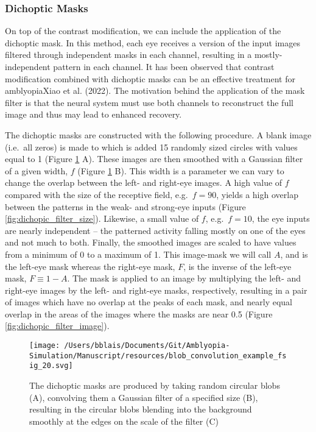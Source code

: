 \documentclass[
  onecolumn]{article}
\begin{document}
\hypertarget{dichoptic-masks}{%
\subsubsection{Dichoptic Masks}\label{dichoptic-masks}}

On top of the contrast modification, we can include the application of
the dichoptic mask. In this method, each eye receives a version of the
input images filtered through independent masks in each channel,
resulting in a mostly-independent pattern in each channel. It has been
observed that contrast modification combined with dichoptic masks can be
an effective treatment for amblyopiaXiao et al. (2022). The motivation
behind the application of the mask filter is that the neural system must
use both channels to reconstruct the full image and thus may lead to
enhanced recovery.

The dichoptic masks are constructed with the following procedure. A
blank image (i.e.~all zeros) is made to which is added 15 randomly sized
circles with values equal to 1 (Figure \ref{fig:dichopic_blob} A). These
images are then smoothed with a Gaussian filter of a given width, \(f\)
(Figure \ref{fig:dichopic_blob} B). This width is a parameter we can
vary to change the overlap between the left- and right-eye images. A
high value of \(f\) compared with the size of the receptive field,
e.g.~\(f=90\), yields a high overlap between the patterns in the weak-
and strong-eye inputs (Figure \ref{fig:dichopic_filter_size}). Likewise,
a small value of \(f\), e.g.~\(f=10\), the eye inputs are nearly
independent -- the patterned activity falling mostly on one of the eyes
and not much to both. Finally, the smoothed images are scaled to have
values from a minimum of 0 to a maximum of 1. This image-mask we will
call \(A\), and is the left-eye mask whereas the right-eye mask, \(F\),
is the inverse of the left-eye mask, \(F\equiv 1-A\). The mask is
applied to an image by multiplying the left- and right-eye images by the
left- and right-eye masks, respectively, resulting in a pair of images
which have no overlap at the peaks of each mask, and nearly equal
overlap in the areas of the images where the masks are near 0.5 (Figure
\ref{fig:dichopic_filter_image}).

\begin{figure}
\hypertarget{fig:dichopic_blob}{%
\centering
\texttt{[image: /Users/bblais/Documents/Git/Amblyopia-Simulation/Manuscript/resources/blob\_convolution\_example\_fsig\_20.svg]}
\caption{The dichoptic masks are produced by taking random circular
blobs (A), convolving them a Gaussian filter of a specified size (B),
resulting in the circular blobs blending into the background smoothly at
the edges on the scale of the filter (C)}\label{fig:dichopic_blob}
}
\end{figure}
\end{document}
